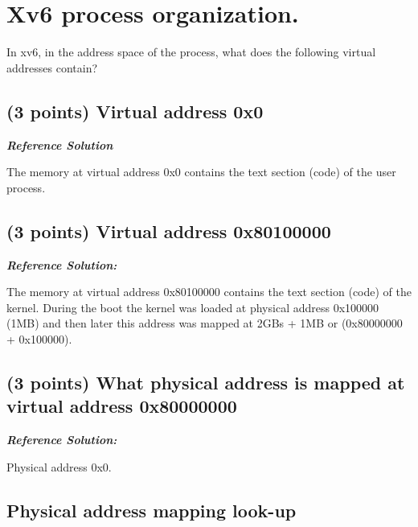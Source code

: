 \documentclass[]{article}
\begin{document}
\hypertarget{xv6-process-organization.}{%
\section{Xv6 process organization.}\label{xv6-process-organization.}}

In xv6, in the address space of the process, what does the following
virtual addresses contain?

\hypertarget{points-virtual-address-0x0}{%
\subsection{(3 points) Virtual address
0x0}\label{points-virtual-address-0x0}}

\textbf{\emph{Reference Solution}}

The memory at virtual address 0x0 contains the text section (code) of
the user process.

\hypertarget{points-virtual-address-0x80100000}{%
\subsection{(3 points) Virtual address
0x80100000}\label{points-virtual-address-0x80100000}}

\textbf{\emph{Reference Solution:}}

The memory at virtual address 0x80100000 contains the text section
(code) of the kernel. During the boot the kernel was loaded at physical
address 0x100000 (1MB) and then later this address was mapped at 2GBs +
1MB or (0x80000000 + 0x100000).

\hypertarget{points-what-physical-address-is-mapped-at-virtual-address-0x80000000}{%
\subsection{(3 points) What physical address is mapped at virtual
address
0x80000000}\label{points-what-physical-address-is-mapped-at-virtual-address-0x80000000}}

\textbf{\emph{Reference Solution:}}

Physical address 0x0.

\hypertarget{physical-address-mapping-look-up}{%
\subsection{Physical address mapping
look-up}\label{physical-address-mapping-look-up}}
\end{document}
